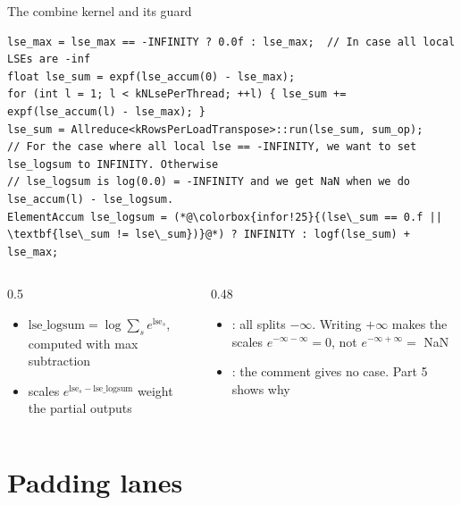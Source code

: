 \documentclass[aspectratio=169,11pt]{beamer}
\newcommand{\code}[1]{\texttt{\detokenize{#1}}}
\newcommand{\NaN}{NaN}
\begin{document}
\begin{frame}[fragile]{The combine kernel and its guard}
\begin{lstlisting}
lse_max = lse_max == -INFINITY ? 0.0f : lse_max;  // In case all local LSEs are -inf
float lse_sum = expf(lse_accum(0) - lse_max);
for (int l = 1; l < kNLsePerThread; ++l) { lse_sum += expf(lse_accum(l) - lse_max); }
lse_sum = Allreduce<kRowsPerLoadTranspose>::run(lse_sum, sum_op);
// For the case where all local lse == -INFINITY, we want to set lse_logsum to INFINITY. Otherwise
// lse_logsum is log(0.0) = -INFINITY and we get NaN when we do lse_accum(l) - lse_logsum.
ElementAccum lse_logsum = (*@\colorbox{infor!25}{(lse\_sum == 0.f || \textbf{lse\_sum != lse\_sum})}@*) ? INFINITY : logf(lse_sum) + lse_max;
\end{lstlisting}
\begin{columns}[T]
\begin{column}{0.5\textwidth}
\small
\begin{itemize}
\item $\mathrm{lse\_logsum}=\log\sum_s e^{\mathrm{lse}_s}$, computed with max subtraction
\item scales $e^{\mathrm{lse}_s-\mathrm{lse\_logsum}}$ weight the partial outputs
\end{itemize}
\end{column}
\begin{column}{0.48\textwidth}
\small
\begin{itemize}
\item \code{lse_sum == 0}: all splits $-\infty$. Writing $+\infty$ makes the scales $e^{-\infty-\infty}=0$, not $e^{-\infty+\infty}=$ \NaN
\item \textbf{\code{lse_sum != lse_sum}}: the comment gives no case. Part 5 shows why
\end{itemize}
\end{column}
\end{columns}
\end{frame}

\section{Padding lanes}
\end{document}
